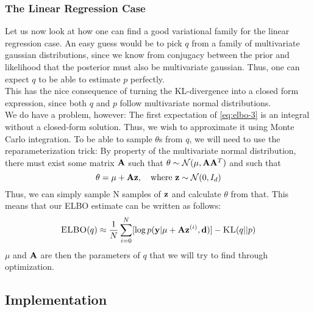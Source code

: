\subsubsection{The Linear Regression Case}
Let us now look at how one can find a good variational family for the linear regression case.
An easy guess would be to pick $q$ from a family of multivariate gaussian distributions, since we know from conjugacy between the prior and likelihood that the posterior must also be multivariate gaussian.
Thus, one can expect $q$ to be able to estimate $p$ perfectly.\\
This has the nice consequence of turning the KL-divergence into a closed form expression, since both $q$ and $p$ follow multivariate normal distributions.\\
We do have a problem, however: The first expectation of \ref{eq:elbo-3} is an integral without a closed-form solution.
Thus, we wish to approximate it using Monte Carlo integration. 
To be able to sample $\theta$s from $q$, we will need to use the reparameterization trick:
By property of the multivariate normal distribution, there must exist some matrix $\mathbf{A}$ such that $\theta \sim \mathcal{N}(\mu, \mathbf{A} \mathbf{A}^T)$ \cite{krause22}
and such that
\begin{equation}\theta = \mu + \B{A}\B{z}, \quad \textrm{where}\ \B{z}\sim \mathcal{N}(0,I_d)\end{equation}
Thus, we can simply sample N samples of $\mathbf{z}$ and calculate $\theta$ from that. 
This means that our ELBO estimate can be written as follows:
\begin{equation}\textsc{ELBO}(q) \approx \frac{1}{N}\sum_{i=0}^N [\log p(\mathbf{y} | \mu + \mathbf{A}\mathbf{z}^{(i)}, \mathbf{d})] - \textsc{KL}(q || p)\label{eq:final-elbo}\end{equation}
$\mu$ and $\mathbf{A}$ are then the parameters of $q$ that we will try to find through optimization.
\subsection{Implementation}
